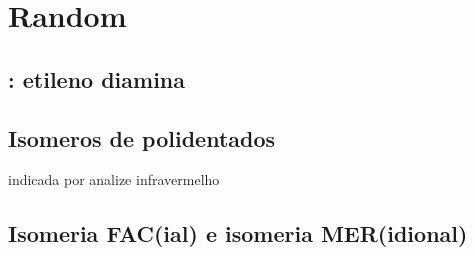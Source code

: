 \documentclass[12pt]{article}
\begin{document}
\break
\section{Random}

\hypertarget{en}{}
\subsection{: etileno diamina}

\subsection{Isomeros de polidentados}
indicada por analize infravermelho

\subsection{ Isomeria FAC(ial) e isomeria MER(idional)}
\end{document}
